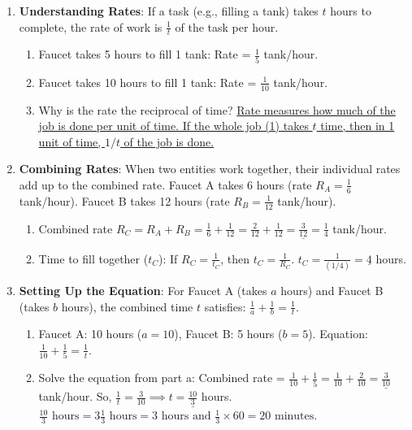 \documentclass[12pt]{article}
\begin{document}
\begin{enumerate}[label=3.\arabic*]
    \item \textbf{Understanding Rates}: If a task (e.g., filling a tank) takes \( t \) hours to complete, the rate of work is \( \frac{1}{t} \) of the task per hour.
    \begin{enumerate}[label=\alph*)]
        \item Faucet takes 5 hours to fill 1 tank: Rate = \underline{\(\frac{1}{5}\)} tank/hour.
        \item Faucet takes 10 hours to fill 1 tank: Rate = \underline{\(\frac{1}{10}\)} tank/hour.
        \item Why is the rate the reciprocal of time? \underline{Rate measures how much of the job is done per unit of time. If the whole job (1) takes \(t\) time, then in 1 unit of time, \(1/t\) of the job is done.}
    \end{enumerate}
    \item \textbf{Combining Rates}: When two entities work together, their individual rates add up to the combined rate.
    Faucet A takes 6 hours (rate \(R_A = \frac{1}{6}\) tank/hour).
    Faucet B takes 12 hours (rate \(R_B = \frac{1}{12}\) tank/hour).
    \begin{enumerate}[label=\alph*)]
        \item Combined rate \(R_C = R_A + R_B = \frac{1}{6} + \frac{1}{12} = \frac{2}{12} + \frac{1}{12} = \underline{\frac{3}{12}} = \frac{1}{4}\) tank/hour.
        \item Time to fill together (\(t_C\)): If \(R_C = \frac{1}{t_C}\), then \(t_C = \frac{1}{R_C}\).
        \(t_C = \frac{1}{(1/4)} = \underline{4}\) hours.
    \end{enumerate}
    \item \textbf{Setting Up the Equation}: For Faucet A (takes \( a \) hours) and Faucet B (takes \( b \) hours), the combined time \( t \) satisfies: \( \frac{1}{a} + \frac{1}{b} = \frac{1}{t} \).
    \begin{enumerate}[label=\alph*)]
        \item Faucet A: 10 hours (\(a=10\)), Faucet B: 5 hours (\(b=5\)).
        Equation: \underline{\(\frac{1}{10} + \frac{1}{5} = \frac{1}{t}\)}.
        \item Solve the equation from part a:
        Combined rate = \( \frac{1}{10} + \frac{1}{5} = \frac{1}{10} + \frac{2}{10} = \underline{\frac{3}{10}} \) tank/hour.
        So, \( \frac{1}{t} = \frac{3}{10} \implies t = \underline{\frac{10}{3}}\) hours.
        \( \frac{10}{3} \text{ hours} = 3 \frac{1}{3} \text{ hours} = 3 \text{ hours and } \frac{1}{3} \times 60 = 20 \text{ minutes}\).

\end{enumerate}
\end{enumerate}
\end{document}
